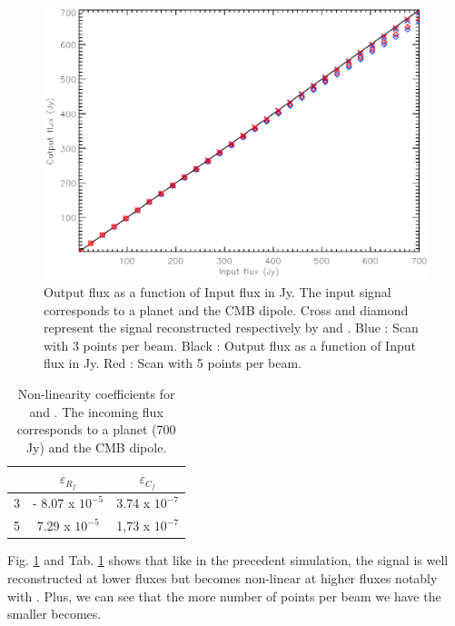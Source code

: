 \begin{figure}[h]
\center
	\includegraphics[scale=0.5]{Figures/NL-planet-dipole.eps}
	\caption{Output flux as a function of Input flux in Jy. 
	The input signal corresponds to a planet and the CMB dipole. Cross and diamond represent the signal reconstructed respectively by \cf and \rf. Blue : Scan with 3 points per beam. Black : Output flux as a function of Input flux in Jy. Red : Scan with 5 points per beam.}
	\label{fig:nl-planet-dipole}
\end{figure}

\begin{table}[h!]
\center
	\begin{tabular}{|c|c|c|}
  	\hline
 	\backslashbox{$npts/fwhm$}{$\varepsilon$} & $	\varepsilon_{R_{f}}$ & $\varepsilon_{C_{f}} $ \\
	\hline
 	3  & - 8.07 x $10^{-5}$ & 3.74 x $10^{-7}$ \\
  	\hline
 	5 & 7.29 x $10^{-5}$ & 1,73 x $10^{-7}$ \\
  	\hline
	\end{tabular} 
\caption{Non-linearity coefficients \eps for \rf and \cf. The incoming flux corresponds to a planet (700 Jy) and the CMB dipole.}
\label{tab:eps-planet-dipole}
\end{table}

Fig. \ref{fig:nl-planet-dipole} and Tab. \ref{tab:eps-planet-dipole} shows that like in the precedent simulation, the signal is well reconstructed at lower fluxes but becomes non-linear at higher fluxes notably with \rf. Plus, we can see that the more number of points per beam we have the smaller \eps becomes. 

